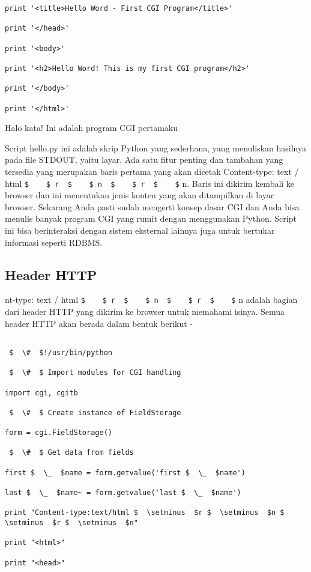 \begin {enumerate}
\begin {enumerate}
\begin{verbatim}
print '<title>Hello Word - First CGI Program</title>'

print '</head>'

print '<body>'

print '<h2>Hello Word! This is my first CGI program</h2>'

print '</body>'

print '</html>'
\end{verbatim}

Halo kata! Ini adalah program CGI pertamaku

Script hello.py ini adalah skrip Python yang sederhana, yang menuliskan hasilnya pada file STDOUT, yaitu layar. Ada satu fitur penting dan tambahan yang tersedia yang merupakan baris pertama yang akan dicetak Content-type: text / html  \verb|$    $ r  $    $ n  $    $ r  $    $| n. Baris ini dikirim kembali ke browser dan ini menentukan jenis konten yang akan ditampilkan di layar browser. Sekarang Anda pasti sudah mengerti konsep dasar CGI dan Anda bisa menulis banyak program CGI yang rumit dengan menggunakan Python. Script ini bisa berinteraksi dengan sistem eksternal lainnya juga untuk bertukar informasi seperti RDBMS.

\subsection{Header HTTP}
nt-type: text / html  \verb|$    $ r  $    $ n  $    $ r  $    $| n adalah bagian dari header HTTP yang dikirim ke browser untuk memahami isinya. Semua header HTTP akan berada dalam bentuk berikut -

\begin{verbatim}

 $  \#  $!/usr/bin/python

 $  \#  $ Import modules for CGI handling

import cgi, cgitb

 $  \#  $ Create instance of FieldStorage

form = cgi.FieldStorage()

 $  \#  $ Get data from fields

first $  \_  $name = form.getvalue('first $  \_  $name')

last $  \_  $name~ = form.getvalue('last $  \_  $name')

print "Content-type:text/html $  \setminus  $r $  \setminus  $n $  \setminus  $r $  \setminus  $n"

print "<html>"

print "<head>"


\end{verbatim}
\end{enumerate}
\end{enumerate}
